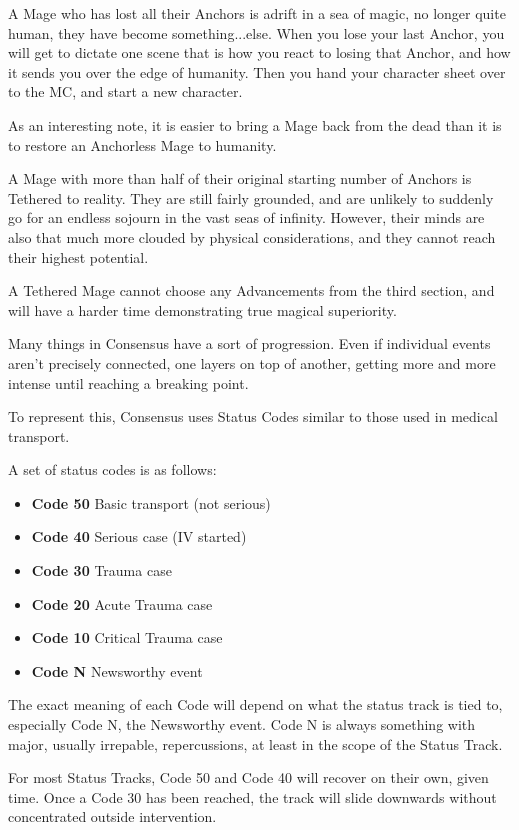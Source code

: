 \documentclass[letterpaper,12pt]{article}
\newcommand{\SECTION}[1]{\vspace{.5em}{\noindent\titlefont\large\textbf{#1}}

}
\begin{document}
A Mage who has lost all their Anchors is adrift in a sea of magic, no
longer quite human, they have become something...else. When you lose
your last Anchor, you will get to dictate one scene that is how you
react to losing that Anchor, and how it sends you over the edge of
humanity. Then you hand your character sheet over to the MC, and start
a new character.

As an interesting note, it is easier to bring a Mage back from the
dead than it is to restore an Anchorless Mage to humanity.

\SECTION{Tethered}
A Mage with more than half of their original starting number of
Anchors is Tethered to reality. They are still fairly grounded, and
are unlikely to suddenly go for an endless sojourn in the vast seas of
infinity. However, their minds are also that much more clouded by
physical considerations, and they cannot reach their highest
potential.

A Tethered Mage cannot choose any Advancements from the third section,
and will have a harder time demonstrating true magical superiority.

\SECTION{Status Tracks}
Many things in Consensus have a sort of progression. Even if
individual events aren't precisely connected, one layers on top of
another, getting more and more intense until reaching a breaking
point.

To represent this, Consensus uses Status Codes similar to those used
in medical transport.

A set of status codes is as follows:

\begin{itemize}
  \setlength{\itemsep}{0em}
\item \textbf{Code 50} Basic transport (not serious)
\item \textbf{Code 40} Serious case (IV started)
\item \textbf{Code 30} Trauma case
\item \textbf{Code 20} Acute Trauma case
\item \textbf{Code 10} Critical Trauma case
\item \textbf{Code N} Newsworthy event
\end{itemize}

The exact meaning of each Code will depend on what the status track is
tied to, especially Code N, the Newsworthy event. Code N is always
something with major, usually irrepable, repercussions, at least in
the scope of the Status Track.

For most Status Tracks, Code 50 and Code 40 will recover on their own,
given time. Once a Code 30 has been reached, the track will slide
downwards without concentrated outside intervention.
\end{document}
